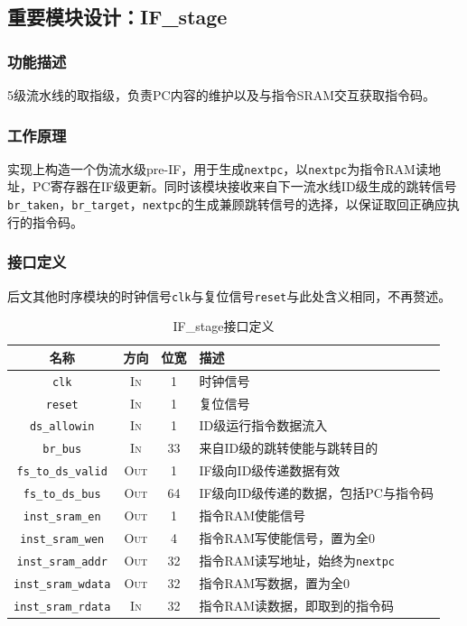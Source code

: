 \documentclass[UTF-8,twoside,c5size]{ctexart}
\begin{document}
	\subsection{重要模块设计：IF\_stage}
	\subsubsection{功能描述}
	
	5级流水线的取指级，负责PC内容的维护以及与指令SRAM交互获取指令码。
	
	\subsubsection{工作原理}
	
	实现上构造一个伪流水级pre-IF，用于生成\texttt{nextpc}，以\texttt{nextpc}为指令RAM读地址，PC寄存器在IF级更新。同时该模块接收来自下一流水线ID级生成的跳转信号\texttt{br\_taken}，\texttt{br\_target}，\texttt{nextpc}的生成兼顾跳转信号的选择，以保证取回正确应执行的指令码。
	
	\newpage
	
	\subsubsection{接口定义}
	
	后文其他时序模块的时钟信号\texttt{clk}与复位信号\texttt{reset}与此处含义相同，不再赘述。
	
	\begin{table}[!h]
		\centering
		\caption{IF\_stage接口定义}
		\begin{tabularx}{\textwidth}{|c|c|c|Y|}
			\hline
			\textbf{名称} & \textbf{方向} & \textbf{位宽} & \textbf{描述} \\
			\hline
			\texttt{clk} & \textsc{In} & 1 & 时钟信号 \\
			\hline
			\texttt{reset} & \textsc{In} & 1 & 复位信号 \\
			\hline
			\texttt{ds\_allowin} & \textsc{In} & 1 & ID级运行指令数据流入 \\
			\hline
			\texttt{br\_bus} & \textsc{In} & 33 & 来自ID级的跳转使能与跳转目的 \\
			\hline
			\texttt{fs\_to\_ds\_valid} & \textsc{Out} & 1 & IF级向ID级传递数据有效 \\
			\hline
			\texttt{fs\_to\_ds\_bus} & \textsc{Out} & 64 & IF级向ID级传递的数据，包括PC与指令码 \\
			\hline
			\texttt{inst\_sram\_en} & \textsc{Out} & 1 & 指令RAM使能信号 \\
			\hline
			\texttt{inst\_sram\_wen} & \textsc{Out} & 4 & 指令RAM写使能信号，置为全0 \\
			\hline
			\texttt{inst\_sram\_addr} & \textsc{Out} & 32 & 指令RAM读写地址，始终为\texttt{nextpc} \\
			\hline
			\texttt{inst\_sram\_wdata} & \textsc{Out} & 32 & 指令RAM写数据，置为全0 \\
			\hline
			\texttt{inst\_sram\_rdata} & \textsc{In} & 32 & 指令RAM读数据，即取到的指令码 \\
			\hline
		\end{tabularx}
	\end{table}
		
\end{document}

